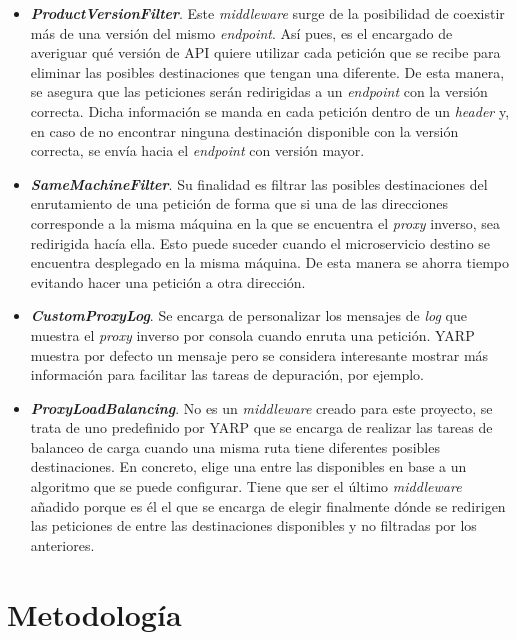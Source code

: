 \documentclass[11pt,spanish,listoffigures]{tfgetsinf}
\begin{document}
\begin{itemize}

	\item \textbf{\emph{ProductVersionFilter}}. Este \emph{middleware} surge de la posibilidad de coexistir más de una versión del mismo \emph{endpoint}. Así pues, es el encargado de averiguar qué versión de API quiere utilizar cada petición que se recibe para eliminar las posibles destinaciones que tengan una diferente. De esta manera, se asegura que las peticiones serán redirigidas a un \emph{endpoint} con la versión correcta. Dicha información se manda en cada petición dentro de un \emph{header} y, en caso de no encontrar ninguna destinación disponible con la versión correcta, se envía hacia el \emph{endpoint} con versión mayor.

	\item \textbf{\emph{SameMachineFilter}}. Su finalidad es filtrar las posibles destinaciones del enrutamiento de una petición de forma que si una de las direcciones corresponde a la misma máquina en la que se encuentra el \emph{proxy} inverso, sea redirigida hacía ella. Esto puede suceder cuando el microservicio destino se encuentra desplegado en la misma máquina. De esta manera se ahorra tiempo evitando hacer una petición a otra dirección.

	\item \textbf{\emph{CustomProxyLog}}. Se encarga de personalizar los mensajes de \emph{log} que muestra el \emph{proxy} inverso por consola cuando enruta una petición. YARP muestra por defecto un mensaje pero se considera interesante mostrar más información para facilitar las tareas de depuración, por ejemplo.

	\item \textbf{\emph{ProxyLoadBalancing}}. No es un \emph{middleware} creado para este proyecto, se trata de uno predefinido por YARP que se encarga de realizar las tareas de balanceo de carga cuando una misma ruta tiene diferentes posibles destinaciones. En concreto, elige una entre las disponibles en base a un algoritmo que se puede configurar. Tiene que ser el último \emph{middleware} añadido porque es él el que se encarga de elegir finalmente dónde se redirigen las peticiones de entre las destinaciones disponibles y no filtradas por los anteriores.

\end{itemize}


	\section{Metodología} \label{metodologia}
\end{document}
